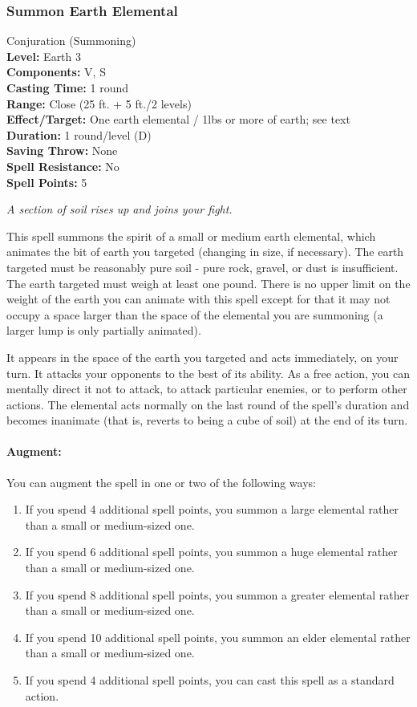 \subsubsection{Summon Earth Elemental}
\label{Spell:SummonEarthElemental}
Conjuration (Summoning)
\\ \textbf{Level:} Earth 3
\\ \textbf{Components:} V, S
\\ \textbf{Casting Time:} 1 round
\\ \textbf{Range:} Close (25 ft. + 5 ft./2 levels)
\\ \textbf{Effect/Target:} One earth elemental / 1lbs or more of earth; see text
\\ \textbf{Duration:} 1 round/level (D)
\\ \textbf{Saving Throw:} None
\\ \textbf{Spell Resistance:} No
\\ \textbf{Spell Points:} 5

\emph{A section of soil rises up and joins your fight.}

This spell summons the spirit of a small or medium earth elemental, which animates the bit of earth you targeted (changing in size, if necessary).
The earth targeted must be reasonably pure soil - pure rock, gravel, or dust is insufficient.
The earth targeted must weigh at least one pound.
There is no upper limit on the weight of the earth you can animate with this spell except 
for that it may not occupy a space larger than the space of the elemental you are summoning (a larger lump is only partially animated).

It appears in the space of the earth you targeted and acts immediately, on your turn.
It attacks your opponents to the best of its ability. 
As a free action, you can mentally direct it not to attack, to attack particular enemies, or to perform other actions. 
The elemental acts normally on the last round of the spell's duration and becomes inanimate (that is, reverts to being a cube of soil) at the end of its turn.

\paragraph{Augment:} You can augment the spell in one or two of the following ways: 
\begin{enumerate}
 \item If you spend 4 additional spell points, you summon a large elemental rather than a small or medium-sized one.
 \item If you spend 6 additional spell points, you summon a huge elemental rather than a small or medium-sized one.
 \item If you spend 8 additional spell points, you summon a greater elemental rather than a small or medium-sized one.
 \item If you spend 10 additional spell points, you summon an elder elemental rather than a small or medium-sized one.
 \item If you spend 4 additional spell points, you can cast this spell as a standard action.
\end{enumerate}
